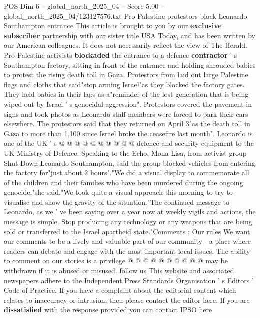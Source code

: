 \begin{textsample}{POS Dim 6 – global\_north\_2025\_04 – Score 5.00 – global\_north\_2025\_04/123127576.txt}  \label{ex:f6_pos_195}
Pro-Palestine protestors block Leonardo Southampton entrance This article is brought to you by our \textbf{exclusive} \textbf{subscriber} partnership with our sister title USA Today, and has been written by our American colleagues.
It does not necessarily reflect the view of The Herald.
Pro-Palestine activists \textbf{blockaded} the entrance to a defence \textbf{contractor} ' s Southampton factory, sitting in front of the entrance and holding shrouded babies to protest the rising death toll in Gaza.
Protestors from laid out large Palestine flags and cloths that said"stop arming Israel"as they blocked the factory gates.
They held babies in their laps as a"reminder of the lost generation that is being wiped out by Israel ' s genocidal aggression".
Protestors covered the pavement in signs and took photos as Leonardo staff members were forced to park their cars elsewhere.
The protestors said that they returned on April 3"as the death toll in Gaza to more than 1,100 since Israel broke the ceasefire last month".
Leonardo is one of the UK ' s @ @ @ @ @ @ @ @ @ @ defence and security equipment to the UK Ministry of Defence.
Speaking to the Echo, Mona Lisa, from activist group Shut Down Leonardo Southampton, said the group blocked vehicles from entering the factory for"just about 2 hours"."We did a visual display to commemorate all of the children and their families who have been murdered during the ongoing genocide,"she said."We took quite a visual approach this morning to try to visualise and show the gravity of the situation."The continued message to Leonardo, as we ' ve been saying over a year now at weekly vigils and actions, the message is simple.
Stop producing any technology or any weapons that are being sold or transferred to the Israel apartheid state."Comments : Our rules We want our comments to be a lively and valuable part of our community - a place where readers can debate and engage with the most important local issues.
The ability to comment on our stories is a privilege @ @ @ @ @ @ @ @ @ @ may be withdrawn if it is abused or misused. follow us This website and associated newspapers adhere to the Independent Press Standards Organisation ' s Editors ' Code of Practice.
If you have a complaint about the editorial content which relates to inaccuracy or intrusion, then please contact the editor here.
If you are \textbf{dissatisfied} with the response provided you can contact IPSO here

\end{textsample}
